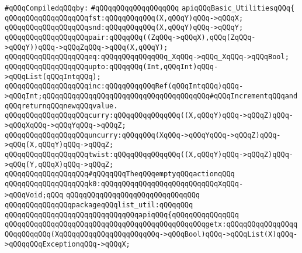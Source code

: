 \newline
\verb|#qQQqCompiledqQQqby:|\newline
\verb|#qQQqqQQqqQQqqQQqqQQq|\newline
\newline
\verb|apiqQQqBasic_UtilitiesqQQq{|\newline
\newline
\verb|qQQqqQQqqQQqqQQqqQQqfst:qQQqqQQqqQQq(X,qQQqY)qQQq->qQQqX;|\newline
\verb|qQQqqQQqqQQqqQQqqQQqsnd:qQQqqQQqqQQq(X,qQQqY)qQQq->qQQqY;|\newline
\verb|qQQqqQQqqQQqqQQqqQQqpair:qQQqqQQq((ZqQQq->qQQqX),qQQq(ZqQQq->qQQqY))qQQq->qQQqZqQQq->qQQq(X,qQQqY);|\newline
\newline
\verb|qQQqqQQqqQQqqQQqqQQqeq:qQQqqQQqqQQqqQQq_XqQQq->qQQq_XqQQq->qQQqBool;|\newline
\newline
\verb|qQQqqQQqqQQqqQQqqQQqupto:qQQqqQQq(Int,qQQqInt)qQQq->qQQqList(qQQqIntqQQq);|\newline
\newline
\verb|qQQqqQQqqQQqqQQqqQQqinc:qQQqqQQqqQQqRef(qQQqIntqQQq)qQQq->qQQqInt;qQQqqQQqqQQqqQQqqQQqqQQqqQQqqQQqqQQqqQQq#qQQqIncrementqQQqandqQQqreturnqQQqnewqQQqvalue.|\newline
\newline
\verb|qQQqqQQqqQQqqQQqqQQqcurry:qQQqqQQqqQQqqQQq((X,qQQqY)qQQq->qQQqZ)qQQq->qQQqXqQQq->qQQqYqQQq->qQQqZ;|\newline
\verb|qQQqqQQqqQQqqQQqqQQquncurry:qQQqqQQq(XqQQq->qQQqYqQQq->qQQqZ)qQQq->qQQq(X,qQQqY)qQQq->qQQqZ;|\newline
\verb|qQQqqQQqqQQqqQQqqQQqtwist:qQQqqQQqqQQqqQQq((X,qQQqY)qQQq->qQQqZ)qQQq->qQQq(Y,qQQqX)qQQq->qQQqZ;|\newline
\newline
\verb|qQQqqQQqqQQqqQQqqQQq#qQQqqQQqTheqQQqemptyqQQqactionqQQq|\newline
\verb|qQQqqQQqqQQqqQQqqQQqk0:qQQqqQQqqQQqqQQqqQQqqQQqqQQqXqQQq->qQQqVoid;qQQq|\newline
\verb|qQQqqQQqqQQqqQQqqQQqqQQqqQQqqQQq|\newline
\verb|qQQqqQQqqQQqqQQqpackageqQQqlist_util:qQQqqQQq|\newline
\verb|qQQqqQQqqQQqqQQqqQQqqQQqqQQqqQQqapiqQQq{qQQqqQQqqQQqqQQq|\newline
\verb|qQQqqQQqqQQqqQQqqQQqqQQqqQQqqQQqqQQqqQQqqQQqqQQqgetx:qQQqqQQqqQQqqQQqqQQqqQQqqQQq(XqQQqqQQqqQQqqQQqqQQqqQQq->qQQqBool)qQQq->qQQqList(X)qQQq->qQQqqQQqExceptionqQQq->qQQqX;|\newline
